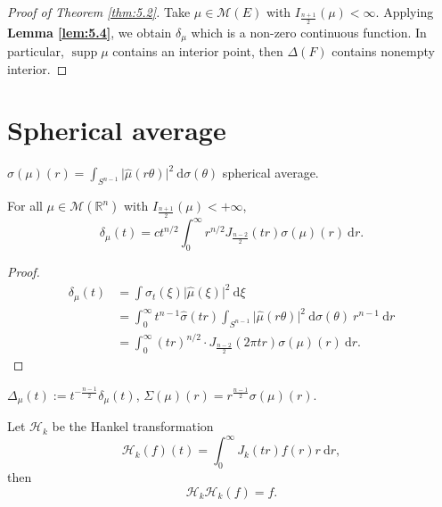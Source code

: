 \begin{proof}[Proof of Theorem \ref{thm:5.2}]
Take $\mu \in \mathcal{M}(E)$ with $I_{\frac{n+1}{2}}(\mu)<\infty$. Applying \textbf{Lemma \ref{lem:5.4}}, we obtain $\delta _{\mu}$ which is a non-zero continuous function. In particular, $\operatorname{supp}\mu$ contains an interior point, then $\Delta(F)$ contains nonempty interior.
\end{proof}

\section{Spherical average}
$\displaystyle \sigma(\mu)(r)=\int _{S^{n-1}}\lvert \hat{\mu}(r\theta) \rvert^{2}\ \mathrm{d}\sigma(\theta)$ spherical average.

\begin{lemma}\label{lem:6.1}
For all $\mu \in \mathcal{M}(\mathbb{R}^{n})$ with $I_{\frac{n+1}{2}}(\mu)<+\infty$,
$$
\delta _{\mu}(t)=ct^{n/2}\int _{0}^{\infty}r^{n/2}J_{\frac{n-2}{2}}(tr)\sigma(\mu)(r)\ \mathrm{d}r.
$$
\end{lemma}
\begin{proof}
$$
\begin{aligned}
\delta _{\mu}(t) & =\int \hat{\sigma}_{t}(\xi)\lvert \hat{\mu}(\xi) \rvert ^{2}\ \mathrm{d}\xi \\
 & = \int _{0}^{\infty} t^{n-1} \hat{\sigma}(tr)\int _{S^{n-1}}\lvert \hat{\mu}(r\theta) \rvert ^{2}\ \mathrm{d}\sigma(\theta)\ r^{n-1}\ \mathrm{d}r \\
 & =\int _{0}^{\infty}(tr)^{n/2}\cdot J_{\frac{n-2}{2}}(2\pi tr)\sigma(\mu)(r)\ \mathrm{d}r.
\end{aligned}
$$
\end{proof}

\begin{definition}\label{def:delta_sigma}
$\Delta _{\mu}(t):=t^{-\frac{n-1}{2}}\delta _{\mu}(t)$, $\Sigma(\mu)(r)=r^{\frac{n-1}{2}}\sigma(\mu)(r)$.
\end{definition}

\begin{lemma}\label{lem:6.2}
Let $\mathcal{H}_{k}$ be the Hankel transformation
$$
\mathcal{H}_{k}(f)(t)=\int _{0}^{\infty}J_{k}(tr)f(r)r\ \mathrm{d}r,
$$
then
$$
\mathcal{H}_{k}\mathcal{H}_{k}(f)=f.
$$
\end{lemma}

